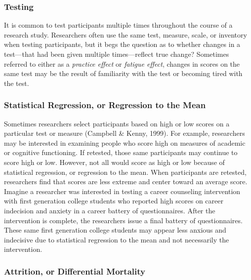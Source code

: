 \documentclass[
  11pt,
]{book}
\begin{document}
\hypertarget{testing}{%
\subsubsection{Testing}\label{testing}}

It is common to test participants multiple times throughout the course of a research study. Researchers often use the same test, measure, scale, or inventory when testing participants, but it begs the question as to whether changes in a test---that had been given multiple times---reflect true change? Sometimes referred to either as a \emph{practice effect} or \emph{fatigue effect}, changes in scores on the same test may be the result of familiarity with the test or becoming tired with the test.

\hypertarget{statistical-regression-or-regression-to-the-mean}{%
\subsubsection{Statistical Regression, or Regression to the Mean}\label{statistical-regression-or-regression-to-the-mean}}

Sometimes researchers select participants based on high or low scores on a particular test or measure (Campbell \& Kenny, 1999). For example, researchers may be interested in examining people who score high on measures of academic or cognitive functioning. If retested, those same participants may continue to score high or low. However, not all would score as high or low because of statistical regression, or regression to the mean. When participants are retested, researchers find that scores are less extreme and center toward an average score. Imagine a researcher was interested in testing a career counseling intervention with first generation college students who reported high scores on career indecision and anxiety in a career battery of questionnaires. After the intervention is complete, the researchers issue a final battery of questionnaires. These same first generation college students may appear less anxious and indecisive due to statistical regression to the mean and not necessarily the intervention.

\hypertarget{attrition-or-differential-mortality}{%
\subsubsection{Attrition, or Differential Mortality}\label{attrition-or-differential-mortality}}
\end{document}
